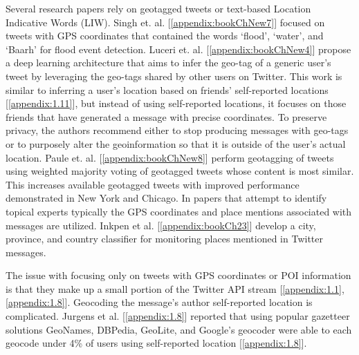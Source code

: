 Several research papers rely on geotagged tweets or text-based Location Indicative Words (LIW). Singh et. al. [\ref{appendix:bookChNew7}] focused on tweets with GPS coordinates that contained the words ‘flood’, ‘water’, and ‘Baarh’ for flood event detection. Luceri et. al. [\ref{appendix:bookChNew4}] propose a deep learning architecture that aims to infer the geo-tag of a generic user’s tweet by leveraging the geo-tags shared by other users on Twitter. This work is similar to inferring a user’s location based on friends’ self-reported locations [\ref{appendix:1.11}], but instead of using self-reported locations, it focuses on those friends that have generated a message with precise coordinates. To preserve privacy, the authors recommend either to stop producing messages with geo-tags or to purposely alter the geoinformation so that it is outside of the user’s actual location. Paule et. al. [\ref{appendix:bookChNew8}] perform geotagging of tweets using weighted majority voting of geotagged tweets whose content is most similar. This increases available geotagged tweets with improved performance demonstrated in New York and Chicago. In papers that attempt to identify topical experts typically the GPS coordinates and place mentions associated with messages are utilized. Inkpen et al. [\ref{appendix:bookCh23}] develop a city, province, and country classifier for monitoring places mentioned in Twitter messages.

The issue with focusing only on tweets with GPS coordinates or POI information is that they make up a small portion of the Twitter API stream [\ref{appendix:1.1}, \ref{appendix:1.8}]. Geocoding the message's author self-reported location is complicated. Jurgens et al. [\ref{appendix:1.8}] reported that using popular gazetteer solutions GeoNames, DBPedia, GeoLite, and Google's geocoder were able to each geocode under 4\% of users using self-reported location [\ref{appendix:1.8}]. %


